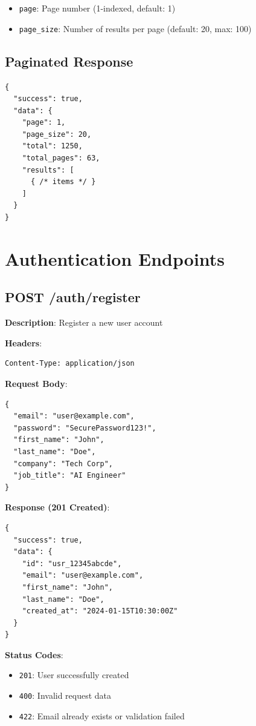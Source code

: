 \documentclass[12pt,a4paper]{report}
\begin{document}
\begin{itemize}
    \item \texttt{page}: Page number (1-indexed, default: 1)
    \item \texttt{page\_size}: Number of results per page (default: 20, max: 100)
\end{itemize}

\section{Paginated Response}

\begin{lstlisting}
{
  "success": true,
  "data": {
    "page": 1,
    "page_size": 20,
    "total": 1250,
    "total_pages": 63,
    "results": [
      { /* items */ }
    ]
  }
}
\end{lstlisting}


\chapter{Authentication Endpoints}

\section{POST /auth/register}

\textbf{Description}: Register a new user account

\textbf{Headers}:
\begin{lstlisting}
Content-Type: application/json
\end{lstlisting}

\textbf{Request Body}:
\begin{lstlisting}
{
  "email": "user@example.com",
  "password": "SecurePassword123!",
  "first_name": "John",
  "last_name": "Doe",
  "company": "Tech Corp",
  "job_title": "AI Engineer"
}
\end{lstlisting}

\textbf{Response (201 Created)}:
\begin{lstlisting}
{
  "success": true,
  "data": {
    "id": "usr_12345abcde",
    "email": "user@example.com",
    "first_name": "John",
    "last_name": "Doe",
    "created_at": "2024-01-15T10:30:00Z"
  }
}
\end{lstlisting}

\textbf{Status Codes}:
\begin{itemize}
    \item \texttt{201}: User successfully created
    \item \texttt{400}: Invalid request data
    \item \texttt{422}: Email already exists or validation failed
\end{itemize}
\end{document}
